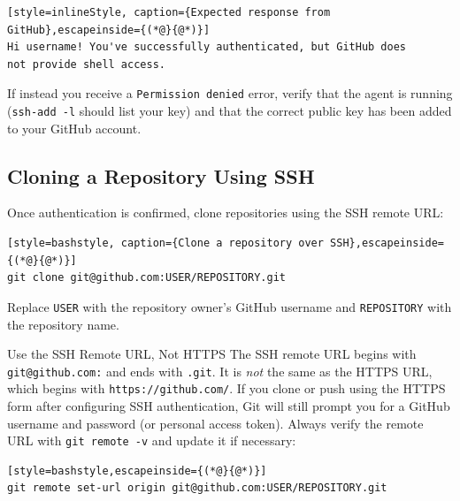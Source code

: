 \begin{lstlisting}[style=inlineStyle, caption={Expected response from GitHub},escapeinside={(*@}{@*)}]
Hi username! You've successfully authenticated, but GitHub does
not provide shell access.
\end{lstlisting}

If instead you receive a \texttt{Permission denied} error, verify that the agent is running (\texttt{ssh-add -l} should list your key) and that the correct public key has been added to your GitHub account.

\subsection{Cloning a Repository Using SSH}

Once authentication is confirmed, clone repositories using the SSH remote URL:

\begin{lstlisting}[style=bashstyle, caption={Clone a repository over SSH},escapeinside={(*@}{@*)}]
git clone git@github.com:USER/REPOSITORY.git
\end{lstlisting}

Replace \texttt{USER} with the repository owner's GitHub username and \texttt{REPOSITORY} with the repository name.

\begin{warningbox}{Use the SSH Remote URL, Not HTTPS}
The SSH remote URL begins with \texttt{git@github.com:} and ends with \texttt{.git}. It is \emph{not} the same as the HTTPS URL, which begins with \texttt{https://github.com/}. If you clone or push using the HTTPS form after configuring SSH authentication, Git will still prompt you for a GitHub username and password (or personal access token). Always verify the remote URL with \texttt{git remote -v} and update it if necessary:

\begin{lstlisting}[style=bashstyle,escapeinside={(*@}{@*)}]
git remote set-url origin git@github.com:USER/REPOSITORY.git
\end{lstlisting}
\end{warningbox}

